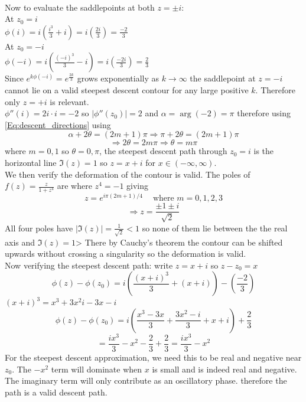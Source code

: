 \\
Now to evaluate the saddlepoints at both $z=\pm i$: 
\\
At $z_0=i$\\
$\phi(i)=i\left(\frac{i^3}{3}+i\right)=i\left(\frac{2i}{3}\right)=\frac{-2}{3}$
\\
At $z_0=-i$\\
$\phi(-i)=i\left(\frac{(-i)^3}{3}-i\right)=i\left(\frac{-2i}{3}\right)=\frac{2}{3}$
\\
Since $e^{k\phi(-i)}=e^{\frac{2k}{3}}$ grows exponentially as $k\to\infty$ the saddlepoint at $z=-i$ cannot lie on a valid steepest descent contour for any large positive $k$. Therefore only $z=+i$ is relevant. 
\\
$\phi''(i)=2i\cdot i=-2$ so $|\phi''(z_0)|=2$ and $\alpha=\arg(-2)=\pi$ therefore using \ref{Eq:descent_directions} using $$\alpha+2\theta=(2m+1)\pi\Rightarrow\pi+2\theta=(2m+1)\pi$$ $$\Rightarrow 2\theta=2m\pi\Rightarrow \theta=m\pi$$ where $m=0,1$ so $\theta=0,\pi$, the steepest descent path through $z_0=i$ is the horizontal line $\Im(z)=1$ so $z=x+i$ for $x\in(-\infty,\infty).$ 
\\
We then verify the deformation of the contour is valid. The poles of $f(z)=\frac{z}{1+z^4}$ are where $z^4=-1$ giving 
\begin{equation}
    z=e^{i\pi(2m+1)/4} \ \ \ \ \text{ where } m=0,1,2,3
\end{equation}
\begin{equation}
    \Rightarrow z=\frac{\pm1\pm i}{\sqrt{2}}
\end{equation}
All four poles have $|\Im(z)|=\frac{1}{\sqrt{2}}<1$ so none of them lie between the the real axis and $\Im(z)=1$> There by Cauchy's theorem the contour can be shifted upwards without crossing a singularity so the deformation is valid. 
\\
Now verifying the steepest descent path: write $z=x+i$ so $z-z_0=x$ 
\begin{equation}
    \phi(z)-\phi(z_0)=i\left(\frac{(x+i)^3}{3}+(x+i)\right)-\left(\frac{-2}{3}\right)
\end{equation}
$(x+i)^3=x^3+3x^2i-3x-i$ $$\phi(z)-\phi(z_0)=i\left(\frac{x^3-3x}{3}+\frac{3x^2-i}{3}+x+i\right)+\frac{2}{3}$$ $$=\frac{ix^3}{3}-x^2-\frac{2}{3}+\frac{2}{3}=\frac{ix^3}{3}-x^2$$ For the steepest descent approximation, we need this to be real and negative near $z_0$. The $-x^2$ term will dominate when $x$ is small and is indeed real and negative. The imaginary term will only contribute as an oscillatory phase. therefore the path is a valid descent path. 
